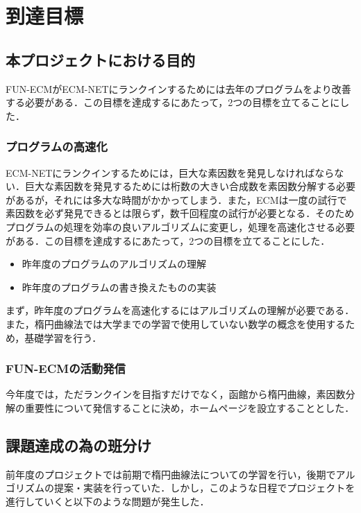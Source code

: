 \documentclass[openany,11pt,papersize]{jsbook}
\begin{document}
\chapter{到達目標}

\section{本プロジェクトにおける目的}\label{sec:mokuteki}

FUN-ECMがECM-NETにランクインするためには去年のプログラムをより改善する必要がある．この目標を達成するにあたって，2つの目標を立てることにした．


\subsection{プログラムの高速化}\label{sec:goal1}

ECM-NETにランクインするためには，巨大な素因数を発見しなければならない．巨大な素因数を発見するためには桁数の大きい合成数を素因数分解する必要があるが，それには多大な時間がかかってしまう．また，ECMは一度の試行で素因数を必ず発見できるとは限らず，数千回程度の試行が必要となる．そのためプログラムの処理を効率の良いアルゴリズムに変更し，処理を高速化させる必要がある．この目標を達成するにあたって，2つの目標を立てることにした．

\begin{itemize}
\item 昨年度のプログラムのアルゴリズムの理解
\item 昨年度のプログラムの書き換えたものの実装
\end{itemize}

まず，昨年度のプログラムを高速化するにはアルゴリズムの理解が必要である．また，楕円曲線法では大学までの学習で使用していない数学の概念を使用するため，基礎学習を行う．


\subsection{FUN-ECMの活動発信}\label{sec:goal2}

今年度では，ただランクインを目指すだけでなく，函館から楕円曲線，素因数分解の重要性について発信することに決め，ホームページを設立することとした．


\section{課題達成の為の班分け}
前年度のプロジェクトでは前期で楕円曲線法についての学習を行い，後期でアルゴリズムの提案・実装を行っていた．しかし，このような日程でプロジェクトを進行していくと以下のような問題が発生した．
\end{document}

